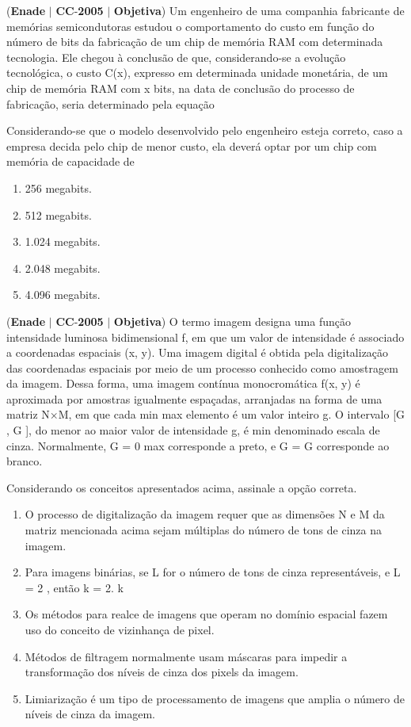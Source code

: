\documentclass{exam}
\begin{document}
\begin{questions}
\question (\textbf{Enade} $|$ \textbf{CC}-\textbf{2005} $|$ \textbf{Objetiva})
Um engenheiro de uma companhia fabricante de
memórias semicondutoras estudou o comportamento
do custo em função do número de bits da fabricação de
um chip de memória RAM com determinada
tecnologia. Ele chegou à conclusão de que,
considerando-se a evolução tecnológica, o custo C(x),
expresso em determinada unidade monetária, de um
chip de memória RAM com x bits, na data de conclusão
do processo de fabricação, seria determinado pela
equação

Considerando-se que o modelo desenvolvido pelo engenheiro
esteja correto, caso a empresa decida pelo chip de menor
custo, ela deverá optar por um chip com memória de
capacidade de
	\begin{enumerate}[label=\alph*)]
		\item  256 megabits.
		\item  512 megabits.
		\item  1.024 megabits.
		\item  2.048 megabits.
		\item  4.096 megabits.
	\end{enumerate}

\question (\textbf{Enade} $|$ \textbf{CC}-\textbf{2005} $|$ \textbf{Objetiva})
O termo imagem designa uma função
intensidade luminosa bidimensional f, em que um valor
de intensidade é associado a coordenadas espaciais
(x, y). Uma imagem digital é obtida pela digitalização
das coordenadas espaciais por meio de um processo
conhecido como amostragem da imagem. Dessa
forma, uma imagem contínua monocromática f(x, y) é
aproximada por amostras igualmente espaçadas,
arranjadas na forma de uma matriz N×M, em que cada
min max
elemento é um valor inteiro g. O intervalo [G , G ],
do menor ao maior valor de intensidade g, é
min
denominado escala de cinza. Normalmente, G = 0
max
corresponde a preto, e G = G corresponde ao
branco.

Considerando os conceitos apresentados acima, assinale a
opção correta.
	\begin{enumerate}[label=\alph*)]
		\item  O processo de digitalização da imagem requer que as
dimensões N e M da matriz mencionada acima sejam
múltiplas do número de tons de cinza na imagem.
		\item  Para imagens binárias, se L for o número de tons de cinza
representáveis, e L = 2 , então k = 2.
k
		\item  Os métodos para realce de imagens que operam no
domínio espacial fazem uso do conceito de vizinhança de
pixel.
		\item  Métodos de filtragem normalmente usam máscaras para
impedir a transformação dos níveis de cinza dos pixels da
imagem.
		\item  Limiarização é um tipo de processamento de imagens que
amplia o número de níveis de cinza da imagem.
	\end{enumerate}


\end{questions}
\end{document}

